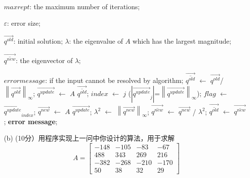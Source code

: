 \documentclass[12pt,a4paper,UTF8]{ctexart}
\begin{document}
\begin{enumerate}
\begin{algorithm}[H]
\begin{algorithmic}[1]
                  $maxrept$: the maximum number of iterations;

                  $\varepsilon $: error size;

                  $\overrightarrow{q^{old}} $: initial solution;
                  \Ensure
                  $\lambda$: the eigenvalue of $A$ which has the largest magnitude;

                  $\overrightarrow{\overline{q^{new}} }$: the eigenvector of $\lambda$;

                  $error message$: if the input cannot be resolved by algorithm;
                  \State $\overrightarrow{\overline{q^{old}}}$ $\leftarrow$ ${\overrightarrow{q^{old}}}$/${\left\lVert \overrightarrow{q^{old}}\right\rVert_{\infty} }$;
                  \State$\overrightarrow{q^{update}} $ $\leftarrow$ $A$ $\overrightarrow{\overline{q^{old}}}$;
                  \State$index$ $\leftarrow$ $j$ ($\left\lvert\overrightarrow{q^{update}}_{j} \right\rvert $=${\left\lVert \overrightarrow{q^{update}}\right\rVert_{\infty} }$);
                  \State$flag$ $\leftarrow$ $\overrightarrow{q^{update}}_{index}$;
                  \State$\overrightarrow{q^{new}}$ $\leftarrow$ $A$ $\overrightarrow{q^{update}}$;
                  \State$\lambda^{2}$ $\leftarrow$ ${\left\lVert \overrightarrow{q^{new}}\right\rVert_{\infty} }$;
                  \State$\overrightarrow{\overline{q^{new}} }$ $\leftarrow$ $\overrightarrow{q^{new}}$ / $\lambda^{2}$;
                  \State{}
                  \State{}
                  \Else
                  \State$\overrightarrow{\overline{q^{old}}}$ $\leftarrow$ $\overrightarrow{\overline{q^{new}}}$ ;
                  \EndIf
                  \EndFor
                  \State \textbf{error message};
              \end{algorithmic}
          \end{algorithm}

          (b) (10分）用程序实现上一问中你设计的算法，用于求解
          \begin{equation}
              A=\left[\begin{array}{rrrr}
                      -148 & -105 & -83  & -67  \\
                      488  & 343  & 269  & 216  \\
                      -382 & -268 & -210 & -170 \\
                      50   & 38   & 32   & 29
                  \end{array}\right]
          \end{equation}



\end{enumerate}
\end{document}
